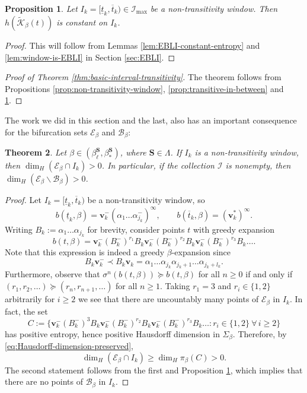 \documentclass[11pt]{amsart}
\newtheorem{theorem}{Theorem}[section]
\newtheorem{proposition}[theorem]{Proposition}
\theoremstyle{definition}
\theoremstyle{remark}
\numberwithin{equation}{section}
\newcommand{\BB}{\mathscr{B}}
\newcommand{\EE}{\mathscr{E}}
\newcommand{\II}{\mathcal{I}}
\newcommand{\Kt}{\widetilde{\mathcal{K}}}
\newcommand{\cs}{ {\mathbf{S}}}
\renewcommand{\v}{\mathbf{v}}
\newcommand{\f}{\infty}
\newcommand{\al}{\alpha}
\newcommand{\lge}{\succcurlyeq}
\newcommand{\si}{\sigma}
\newcommand{\La}{\Lambda}
\begin{document}
\begin{proposition} \label{prop:entropy-constant-in-window}
Let $I_k=[\underline{t}_k,\overline{t}_k)\in\II_{\max}$ be a non-transitivity window. Then $h(\Kt_\beta(t))$ is constant on $I_k$.
\end{proposition}

\begin{proof}
This will follow from Lemmas \ref{lem:EBLI-constant-entropy} and \ref{lem:window-is-EBLI} in Section \ref{sec:EBLI}.
\end{proof}

\begin{proof}[Proof of Theorem \ref{thm:basic-interval-transitivity}]
The theorem follows from Propositions \ref{prop:non-transitivity-window}, \ref{prop:transitive-in-between} and \ref{prop:entropy-constant-in-window}.
\end{proof}

The work we did in this section and the last, also has an important consequence for the bifurcation sets $\EE_\beta$ and $\BB_\beta$:

\begin{theorem} \label{thm:bifurcation-in-basic-interval}
Let $\beta\in(\beta_\ell^{\cs},\beta_*^{\cs})$, where $\cs\in\La$. If $I_k$ is a non-transitivity window, then $\dim_H(\EE_\beta\cap I_k)>0$. In particular, if the collection $\II$ is nonempty, then $\dim_H(\EE_\beta\backslash\BB_\beta)>0$.
\end{theorem}

\begin{proof}
Let $I_k=[\underline{t}_k,\overline{t}_k)$ be a non-transitivity window, so
\[
b(\underline{t}_k,\beta)=\v_k^-(\al_1\dots\al_{j_k}^-)^\f, \qquad b(\overline{t}_k,\beta)=(\v_k^*)^\f.
\]
Writing $B_k:=\al_1\dots\al_{j_k}$ for brevity, consider points $t$ with greedy expansion
\[
b(t,\beta)=\v_k^-(B_k^-)^{r_1}B_k \v_k^-(B_k^-)^{r_2}B_k \v_k^-(B_k^-)^{r_3}B_k\dots.
\]
Note that this expression is indeed a greedy $\beta$-expansion since
\[
B_k\v_k^-\prec B_k\v_k=\al_1\dots\al_{j_k}\al_{j_k+1}\dots\al_{j_k+l_k}.
\]
Furthermore, observe that $\si^n(b(t,\beta))\lge b(t,\beta)$ for all $n\geq 0$ if and only if $(r_1,r_2,\dots)\lge (r_n,r_{n+1},\dots)$ for all $n\geq 1$. Taking $r_1=3$ and $r_i\in\{1,2\}$ arbitrarily for $i\geq 2$ we see that there are uncountably many points of $\EE_\beta$ in $I_k$. In fact, the set
\[
C:=\{\v_k^-(B_k^-)^3 B_k\v_k^-(B_k^-)^{r_2}B_k\v_k^-(B_k^-)^{r_3}B_k\dots: r_i\in\{1,2\}\ \forall\,i\geq 2\}
\]
has positive entropy, hence positive Hausdorff dimension in $\Sigma_\beta$. Therefore, by \eqref{eq:Hausdorff-dimension-preserved},
\[
\dim_H(\EE_\beta\cap I_k)\geq \dim_H \pi_\beta(C)>0.
\]
The second statement follows from the first and Proposition \ref{prop:entropy-constant-in-window}, which implies that there are no points of $\BB_\beta$ in $I_k$.
\end{proof}
\end{document}

